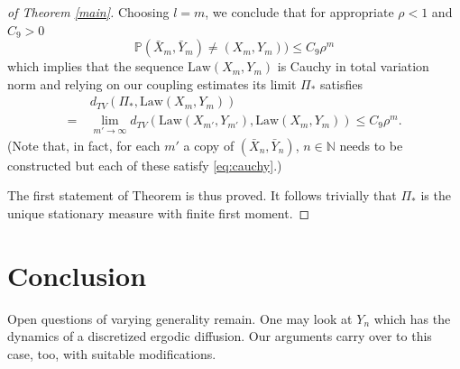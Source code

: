 \documentclass{article}
\begin{document}
\begin{proof}[of Theorem \ref{main}]



Choosing $l=m$, we conclude that for appropriate $\rho<1$ and $C_{9}>0$
\begin{equation}
  \label{eq:cauchy}
\mathbb{P}(\bar{X}_{m},\bar{Y}_{m})\neq (X_m,Y_m))\leq C_{9}\rho^{m}
\end{equation}
which implies that the sequence $\mathrm{Law}(X_{m},Y_{m})$ is Cauchy in total variation norm and relying on our coupling estimates its
limit $\Pi_{*}$ satisfies
\begin{align*}
  & d_{TV}(\Pi_{*},\mathrm{Law}(X_{m},Y_{m}))\\
  =~&\lim_{m'\to\infty}d_{TV}(\mathrm{Law}(X_{m'},Y_{m'}),\mathrm{Law}(X_{m},Y_{m}))
\leq C_{9}\rho^{m}.
\end{align*}
 (Note that, in fact, for each $m'$ a copy of $(\bar{X}_{n},\bar{Y}_{n})$, $n\in\mathbb{N}$
needs to be constructed but each of these satisfy \eqref{eq:cauchy}.)

The first statement of Theorem is thus proved.
It follows trivially that $\Pi_{*}$ is the unique stationary measure
with finite first moment.
\end{proof}



\section{Conclusion}\label{conclu}

Open questions of varying generality remain. One may look at $Y_{n}$ which has the dynamics of
a discretized ergodic diffusion. Our arguments carry over to this case, too, with suitable
modifications. 
\end{document}
